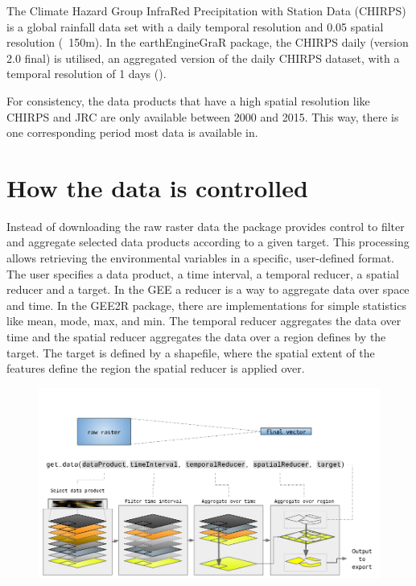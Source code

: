 The Climate Hazard Group InfraRed Precipitation with Station Data (CHIRPS) is a global rainfall data set with a daily temporal resolution and 0.05 spatial resolution (~150m). In the earthEngineGraR package, the CHIRPS daily (version 2.0 final) is utilised, an aggregated version of the daily CHIRPS dataset, with a temporal resolution of 1 days (\cite{funk2015climate}).

For consistency, the data products that have a high spatial resolution like CHIRPS and JRC are only available between 2000 and 2015. This way, there is one corresponding period most data is available in.




\section{How the data is controlled}



Instead of downloading the raw raster data the package provides control to filter and aggregate selected data products according to a given target. This processing allows retrieving the environmental variables in a specific, user-defined format. The user specifies a data product,  a time interval, a temporal reducer, a spatial reducer and a target. In the GEE a reducer is a way to aggregate data over space and time. In the GEE2R package, there are implementations for simple statistics like mean, mode, max, and min. The temporal reducer aggregates the data over time and the spatial reducer aggregates the data over a region defines by the target. 
The target is defined by a shapefile, where the spatial extent of the features define the region the spatial reducer is applied over.

\begin{center}
	\begin{figure}[h]
		\begin{center}
			\includegraphics[width=15cm]{images/design_function.pdf}
		\end{center}
	\end{figure}
\end{center}


